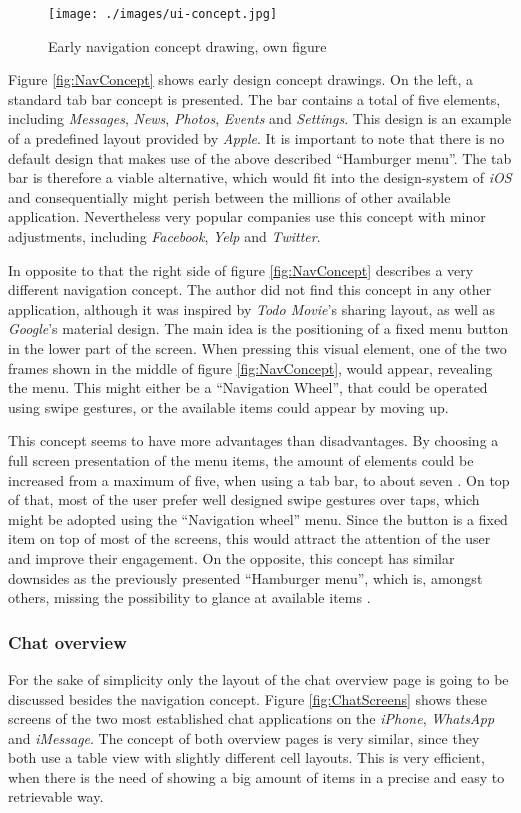 \begin{figure}[h]
  	\centering
  	\texttt{[image: ./images/ui-concept.jpg]}
  	\caption{Early navigation concept drawing, own figure}
	\label{fig:NavConcept}
\end{figure}

Figure \vref{fig:NavConcept} shows early design concept drawings. On the left, a standard tab bar concept is presented. The bar contains a total of five elements, including \emph{Messages}, \emph{News}, \emph{Photos}, \emph{Events} and \emph{Settings}. This design is an example of a predefined layout provided by \emph{Apple}. It is important to note that there is no default design that makes use of the above described \enquote{Hamburger menu}. The tab bar is therefore a viable alternative, which would fit into the design-system of \emph{iOS} and consequentially might perish between the millions of other available application. Nevertheless very popular companies use this concept with minor adjustments, including \emph{Facebook}, \emph{Yelp} and \emph{Twitter}.

In opposite to that the right side of figure \vref{fig:NavConcept} describes a very different navigation concept. The author did not find this concept in any other application, although it was inspired by \emph{Todo Movie}'s sharing layout, as well as \emph{Google}'s material design. The main idea is the positioning of a fixed menu button in the lower part of the screen. When pressing this visual element, one of the two frames shown in the middle of figure \vref{fig:NavConcept}, would appear, revealing the menu. This might either be a \enquote{Navigation Wheel}, that could be operated using swipe gestures, or the available items could appear by moving up.

This concept seems to have more advantages than disadvantages. By choosing a full screen presentation of the menu items, the amount of elements could be increased from a maximum of five, when using a tab bar, to about seven \cite{Crestodina:2015aa}. On top of that, most of the user prefer well designed swipe gestures over taps, which might be adopted using the \enquote{Navigation wheel} menu. Since the button is a fixed item on top of most of the screens, this would attract the attention of the user and improve their engagement. On the opposite, this concept has similar downsides as the previously presented \enquote{Hamburger menu}, which is, amongst others, missing the possibility to glance at available items \cite{Abreu:2014aa}.

\subsubsection{Chat overview}
\label{sec:ChatOverview}
For the sake of simplicity only the layout of the chat overview page is going to be discussed besides the navigation concept. Figure \vref{fig:ChatScreens} shows these screens of the two most established chat applications on the \emph{iPhone}, \emph{WhatsApp} and \emph{iMessage}. The concept of both overview pages is very similar, since they both use a table view with slightly different cell layouts. This is very efficient, when there is the need of showing a big amount of items in a precise and easy to retrievable way. 

